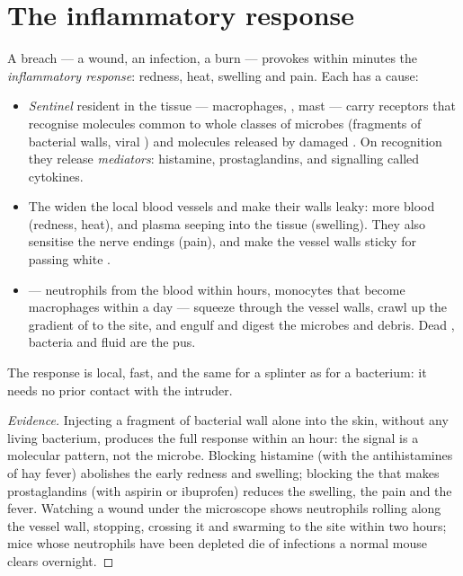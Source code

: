 \section{The inflammatory response}

\begin{proposition}\label{prop:g12:innate-immunity:inflammation}
A breach --- a wound, an infection, a burn --- provokes within minutes
the \emph{inflammatory response}: redness, heat,
swelling and pain. Each has a cause:
\begin{itemize}
  \item \emph{Sentinel } resident in the tissue --- macrophages,
        , mast  --- carry receptors that recognise
        molecules common to whole classes of microbes (fragments of
        bacterial walls, viral ) and molecules released by
        damaged . On recognition they release
        \emph{mediators}: histamine,
        prostaglandins, and signalling  called cytokines.
  \item The  widen the local blood vessels and make their
        walls leaky: more blood (redness, heat), and plasma seeping
        into the tissue (swelling). They also sensitise the nerve
        endings (pain), and make the vessel walls sticky for passing
        white .
  \item \emph{} --- neutrophils from the blood within hours,
        monocytes that become macrophages within a day --- squeeze
        through the vessel walls, crawl up the gradient of 
        to the site, and engulf and digest the microbes and debris.
        Dead , bacteria and fluid are the pus.
\end{itemize}
The response is local, fast, and the same for a splinter as for a
bacterium: it needs no prior contact with the intruder.
\end{proposition}
\begin{proof}[Evidence]
Injecting a fragment of bacterial wall alone into the skin, without
any living bacterium, produces the full response within an hour: the
signal is a molecular pattern, not the microbe. Blocking histamine
(with the antihistamines of hay fever) abolishes the early redness and
swelling; blocking the  that makes prostaglandins (with aspirin
or ibuprofen) reduces the swelling, the pain and the fever. Watching
a wound under the microscope shows neutrophils rolling along the
vessel wall, stopping, crossing it and swarming to the site within two
hours; mice whose neutrophils have been depleted die of infections a
normal mouse clears overnight.
\end{proof}

